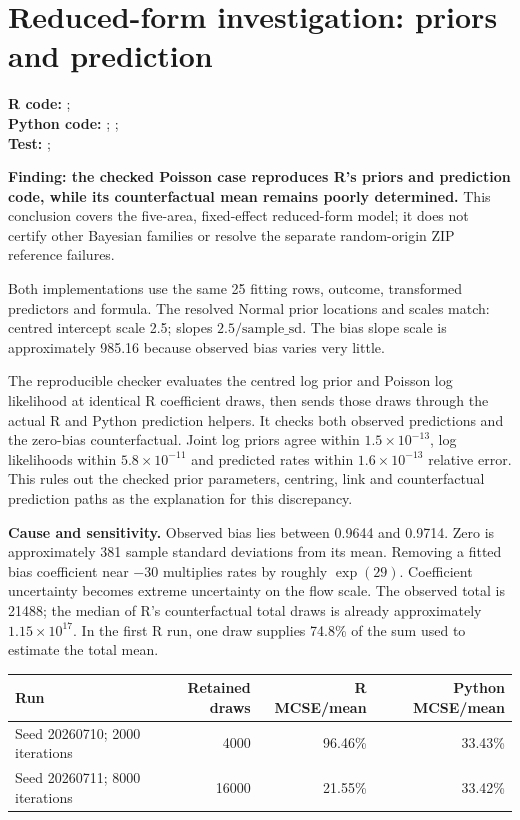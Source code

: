 \documentclass[10pt]{article}
\begin{document}
\section{Reduced-form investigation: priors and prediction}
{\footnotesize \textbf{R code:} ; \\ \textbf{Python code:} ; ; \\ \textbf{Test:} ; \par}


\textbf{Finding: the checked Poisson case reproduces R's priors and prediction
code, while its counterfactual mean remains poorly determined.} This conclusion
covers the five-area, fixed-effect reduced-form model; it does not certify other
Bayesian families or resolve the separate random-origin ZIP reference failures.

Both implementations use the same 25 fitting rows, outcome, transformed
predictors and formula. The resolved Normal prior locations and scales match:
centred intercept scale 2.5; slopes $2.5/\mathrm{sample\_sd}$. The bias slope
scale is approximately 985.16 because observed bias varies very little.

The reproducible checker evaluates the centred log prior and Poisson log
likelihood at identical R coefficient draws, then sends those draws through
the actual R and Python prediction helpers. It checks both observed predictions
and the zero-bias counterfactual. Joint log priors agree within
$1.5\times10^{-13}$, log likelihoods within $5.8\times10^{-11}$ and predicted
rates within $1.6\times10^{-13}$ relative error. This rules out the checked
prior parameters, centring, link and counterfactual prediction paths as the
explanation for this discrepancy.

\textbf{Cause and sensitivity.} Observed bias lies between 0.9644 and 0.9714.
Zero is approximately 381 sample standard deviations from its mean. Removing
a fitted bias coefficient near $-30$ multiplies rates by roughly $\exp(29)$.
Coefficient uncertainty becomes extreme uncertainty on the flow scale. The
observed total is 21488; the median of R's counterfactual total draws is already
approximately $1.15\times10^{17}$. In the first R run, one draw supplies 74.8\%
of the sum used to estimate the total mean.

\begin{tabularx}{\textwidth}{@{}Xrrr@{}}
\toprule
Run & Retained draws & R MCSE/mean & Python MCSE/mean \\
\midrule
Seed 20260710; 2000 iterations & 4000 & 96.46\% & 33.43\% \\
Seed 20260711; 8000 iterations & 16000 & 21.55\% & 33.42\% \\
\bottomrule
\end{tabularx}
\end{document}
